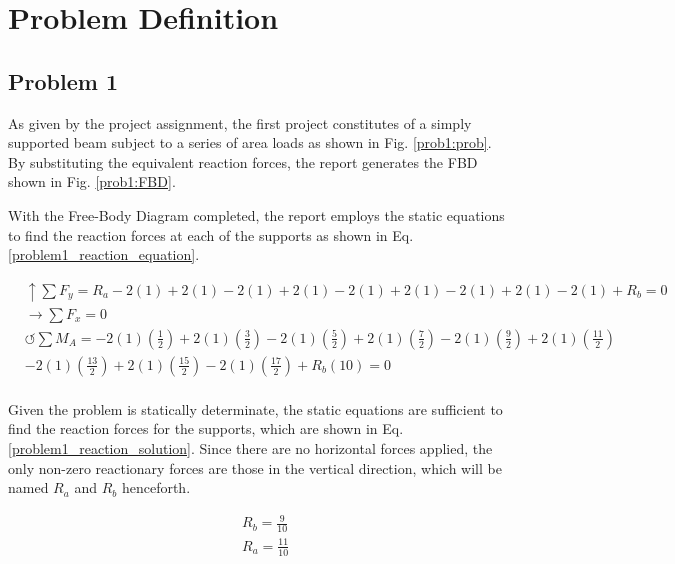 \documentclass[a4paper]{article}
\begin{document}
\section{Problem Definition} \label{Problems}
\subsection{Problem 1}

As given by the project assignment, the first project constitutes of a simply supported beam subject to a series of area loads as shown in Fig. \ref{prob1:prob}. By substituting the equivalent reaction forces, the report generates the FBD shown in Fig. \ref{prob1:FBD}.


With the Free-Body Diagram completed, the report employs the static equations to find the reaction forces at each of the supports as shown in Eq. \ref{problem1_reaction_equation}.

\begin{equation}
\begin{split}
	&\uparrow \sum F_y = R_a - 2(1) + 2(1) - 2(1) + 2(1) - 2(1) + 2(1) - 2(1) + 2(1) - 2(1) + R_b = 0 \\
 	&\rightarrow \sum F_x = 0 \\
 	&\circlearrowleft \sum M_A = -2(1)\left(\frac{1}{2}\right) + 2(1)\left(\frac{3}{2}\right) - 2(1)\left(\frac{5}{2}\right) + 2(1)\left(\frac{7}{2}\right) - 2(1)\left(\frac{9}{2}\right) + 2(1)\left(\frac{11}{2}\right) \\ 
	& - 2(1)\left(\frac{13}{2}\right) + 2(1)\left(\frac{15}{2}\right) - 2(1)\left(\frac{17}{2}\right) + R_b(10) = 0 \\
\end{split}
\label{problem1_reaction_equation}
\end{equation}

Given the problem is statically determinate, the static equations are sufficient to find the reaction forces for the supports, which are shown in Eq. \ref{problem1_reaction_solution}. Since there are no horizontal forces applied, the only non-zero reactionary forces are those in the vertical direction, which will be named $R_a$ and $R_b$ henceforth.

\begin{equation}
\begin{split}
	& R_b = \frac{9}{10} \\
	& R_a = \frac{11}{10} \\
\end{split}
\label{problem1_reaction_solution}
\end{equation}
\end{document}
